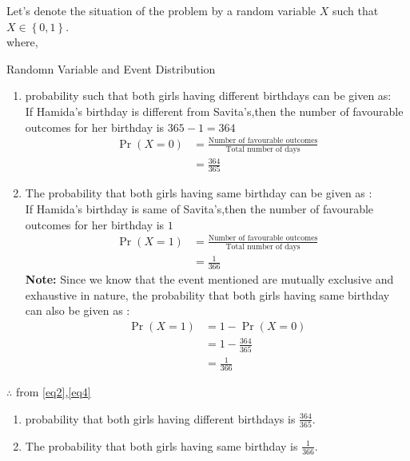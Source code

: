 \documentclass[journal,12pt,twocolumn]{IEEEtran}
\providecommand{\pr}[1]{\ensuremath{\Pr\left(#1\right)}}
\providecommand{\cbrak}[1]{\ensuremath{\left\{#1\right\}}}
\newcommand{\note}{\noindent \textbf{Note: }}
\begin{document}
Let's denote the situation of the problem by a random variable $X$ such that $X\in \cbrak{0,1}$. \\
where,\\
\begin{table}[H]

	\caption{Randomn Variable and Event Distribution}
	\label{tab : TABLE I}
\end{table}
\begin{enumerate}[label=(\roman{enumi})]
\item probability such that both girls having different birthdays can be given as: \\

If Hamida's birthday is different from Savita's,then the number of favourable outcomes for her birthday is $365-1 =364$
\begin{align}
	 \pr{X=0} &= \frac{\text{Number of favourable outcomes}}{\text{Total number of days}}\label{eq1}\\
	&=\frac{364}{365}\label{eq2}
\end{align}
\item The probability that both girls having same birthday can be given as :\\

If Hamida's birthday is same of Savita's,then the number of favourable outcomes for her birthday is $1$
\begin{align}
	 \pr{X=1}&=\frac{\text{Number of favourable outcomes}}{\text{Total number of days}}\label{eq3}\\
	&=\frac{1}{366}\label{eq4}
\end{align}
\note Since we know that the event mentioned are mutually exclusive and exhaustive in nature, the probability that both girls having same birthday can also be given as :
\begin{align}
	\pr{X=1}&=1-\pr{X=0}\label{eq5}\\
	&=1-\frac{364}{365}\label{eq6}\\
	&=\frac{1}{366}\label{eq7}
\end{align}
\end{enumerate}
$\therefore$ from \eqref{eq2},\eqref{eq4}\\
\begin{enumerate}[label=(\roman{enumi})]
\item probability that both girls having different birthdays is $\frac{364}{365}$.\\

\item The probability that both girls having same birthday is $\frac{1}{366}$.
\end{enumerate}
\end{document}
